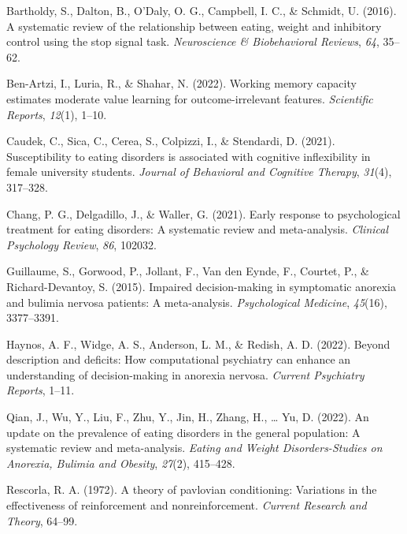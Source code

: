 \documentclass[
  man,floatsintext]{apa6}
\newlength{\cslhangindent}
\newlength{\cslentryspacingunit} %
\newenvironment{CSLReferences}[2] %
 {%
  \setlength{\parindent}{0pt}
  \ifodd #1
  \let\oldpar\par
  \def\par{\hangindent=\cslhangindent\oldpar}
  \fi
  \setlength{\parskip}{#2\cslentryspacingunit}
 }%
 {}
\begin{document}
\hypertarget{refs}{}
\begin{CSLReferences}{1}{0}
\leavevmode{}%
Bartholdy, S., Dalton, B., O'Daly, O. G., Campbell, I. C., \& Schmidt, U. (2016). A systematic review of the relationship between eating, weight and inhibitory control using the stop signal task. \emph{Neuroscience \& Biobehavioral Reviews}, \emph{64}, 35--62.

\leavevmode{}%
Ben-Artzi, I., Luria, R., \& Shahar, N. (2022). Working memory capacity estimates moderate value learning for outcome-irrelevant features. \emph{Scientific Reports}, \emph{12}(1), 1--10.

\leavevmode{}%
Caudek, C., Sica, C., Cerea, S., Colpizzi, I., \& Stendardi, D. (2021). Susceptibility to eating disorders is associated with cognitive inflexibility in female university students. \emph{Journal of Behavioral and Cognitive Therapy}, \emph{31}(4), 317--328.

\leavevmode{}%
Chang, P. G., Delgadillo, J., \& Waller, G. (2021). Early response to psychological treatment for eating disorders: A systematic review and meta-analysis. \emph{Clinical Psychology Review}, \emph{86}, 102032.

\leavevmode{}%
Guillaume, S., Gorwood, P., Jollant, F., Van den Eynde, F., Courtet, P., \& Richard-Devantoy, S. (2015). Impaired decision-making in symptomatic anorexia and bulimia nervosa patients: A meta-analysis. \emph{Psychological Medicine}, \emph{45}(16), 3377--3391.

\leavevmode{}%
Haynos, A. F., Widge, A. S., Anderson, L. M., \& Redish, A. D. (2022). Beyond description and deficits: How computational psychiatry can enhance an understanding of decision-making in anorexia nervosa. \emph{Current Psychiatry Reports}, 1--11.

\leavevmode{}%
Qian, J., Wu, Y., Liu, F., Zhu, Y., Jin, H., Zhang, H., \ldots{} Yu, D. (2022). An update on the prevalence of eating disorders in the general population: A systematic review and meta-analysis. \emph{Eating and Weight Disorders-Studies on Anorexia, Bulimia and Obesity}, \emph{27}(2), 415--428.

\leavevmode{}%
Rescorla, R. A. (1972). A theory of pavlovian conditioning: Variations in the effectiveness of reinforcement and nonreinforcement. \emph{Current Research and Theory}, 64--99.


\end{CSLReferences}
\end{document}
